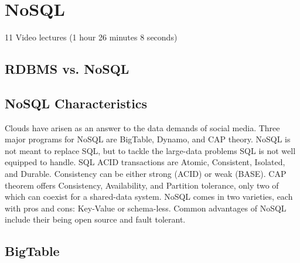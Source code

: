 \chapter{NoSQL}
\label{sec:icloud-nosql}

\FILENAME

  11 Video lectures (1 hour 26 minutes 8 seconds)

\section{RDBMS vs. NoSQL}




\section{NoSQL Characteristics}

Clouds have arisen as an answer to the data demands of social media.
Three major programs for NoSQL are BigTable, Dynamo, and CAP theory.
NoSQL is not meant to replace SQL, but to tackle the large-data problems
SQL is not well equipped to handle. SQL ACID transactions are Atomic,
Consistent, Isolated, and Durable. Consistency can be either strong
(ACID) or weak (BASE). CAP theorem offers Consistency, Availability, and
Partition tolerance, only two of which can coexist for a shared-data
system. NoSQL comes in two varieties, each with pros and cons: Key-Value
or schema-less. Common advantages of NoSQL include their being open
source and fault tolerant.




\section{BigTable}

